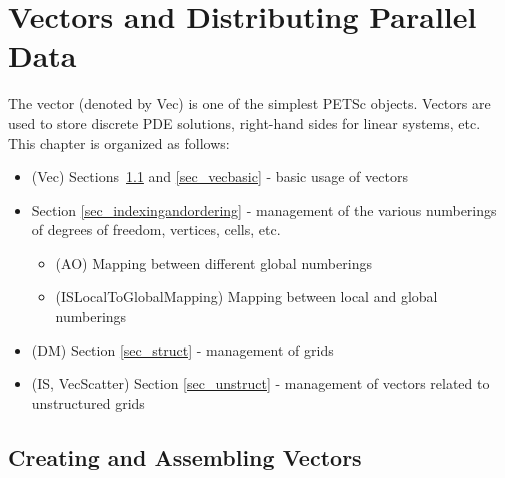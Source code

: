 %
%

\cleardoublepage
\chapter{Vectors and Distributing Parallel Data} 
\label{chapter_vectors}

The vector (denoted by Vec) is one of the simplest PETSc
objects.  Vectors are used to store discrete PDE solutions, right-hand
sides for linear systems, etc. This chapter is organized as follows:

\begin{itemize}
\item (Vec) Sections~\ref{sec_veccreate} and \ref{sec_vecbasic} - basic usage of vectors
\item Section \ref{sec_indexingandordering} - management of the various numberings of
               degrees of freedom, vertices, cells, etc.
  \begin{itemize} 
  \item (AO) Mapping between different global numberings
  \item (ISLocalToGlobalMapping) Mapping between local and global numberings
  \end{itemize}
\item (DM) Section \ref{sec_struct} - management of grids
\item (IS, VecScatter) Section \ref{sec_unstruct} - management of vectors related to 
      unstructured grids
\end{itemize}

\section{Creating and Assembling Vectors}
\label{sec_veccreate}

